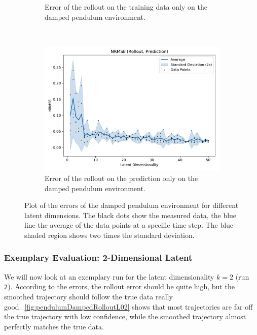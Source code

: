 \begin{figure}
\begin{subfigure}{0.5\linewidth}
					\caption[Error of the training rollout on the damped pendulum environment]{Error of the rollout on the training data only on the damped pendulum environment.}
					\label{fig:pendulumDampedRmseTrain}
				\end{subfigure}%
				~
				\begin{subfigure}{0.5\linewidth}
					\centering
					\includegraphics[width=\linewidth]{figures/results/pendulum-damped/latent-dim/comparison-rmse-rollout-prediction-normalized-mean-vs-latent-dim.pdf}
					\caption[Error of the prediction rollout on the damped pendulum environment]{Error of the rollout on the prediction only on the damped pendulum environment.}
					\label{fig:pendulumDampedRmsePred}
				\end{subfigure}
				\caption[Errors on the damped pendulum environment for different latent dimensions]{Plot of the errors of the damped pendulum environment for different latent dimensions. The black dots show the measured data, the blue line the average of the data points at a specific time step. The blue shaded region shows two times the standard deviation.}
				\label{fig:pendulumDampedRmse}
			\end{figure}

		\subsubsection{Exemplary Evaluation: 2-Dimensional Latent}
			We will now look at an exemplary run for the latent dimensionality \( k = 2 \) (run \texttt{2}). According to the errors, the rollout error should be quite high, but the smoothed trajectory should follow the true data really good.~\autoref{fig:pendulumDampedRolloutL02} shows that most trajectories are far off the true trajectory with low confidence, while the smoothed trajectory almost perfectly matches the true data.


